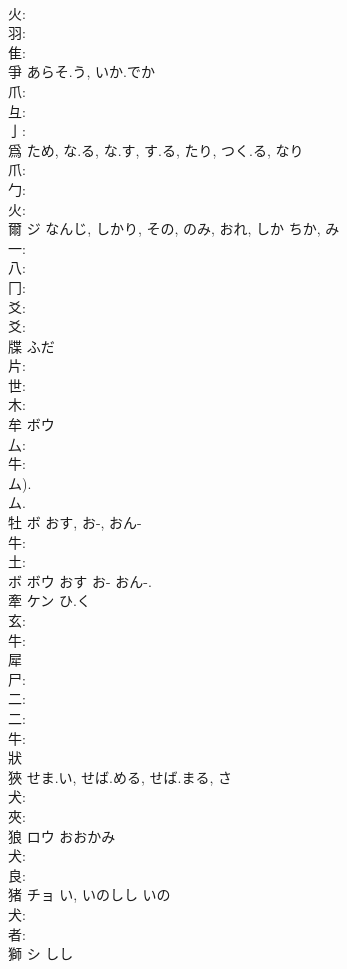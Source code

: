 \documentclass[8pt]{extreport}
\begin{document}
\begin{CJK}{UTF8}{min}
\\	火: 
\\	羽: 
\\	隹: 
\\	爭		あらそ.う, いか.でか				
\\	爪: 
\\	彑: 
\\	亅: 
\\	爲		ため, な.る, な.す, す.る, たり, つく.る, なり				
\\	爪: 
\\	勹: 
\\	火: 
\\	爾	ジ	なんじ, しかり, その, のみ, おれ, しか	ちか, み	
\\	一: 
\\	八: 
\\	冂: 
\\	爻: 
\\	爻: 
\\	牒		ふだ				
\\	片: 
\\	世: 
\\	木: 
\\	牟	ボウ			
\\	厶: 
\\	牛: 
\\	ム).
\\	ム.
\\	牡	ボ	おす, お-, おん-		
\\	牛: 
\\	土: 
\\	ボ ボウ おす お- おん-.
\\	牽	ケン	ひ.く		
\\	玄: 
\\	牛: 
\\	犀						
\\	尸: 
\\	二: 
\\	二: 
\\	牛: 
\\	狀						
\\	狹		せま.い, せば.める, せば.まる, さ				
\\	犬: 
\\	夾: 
\\	狼	ロウ	おおかみ		
\\	犬: 
\\	良: 
\\	猪	チョ	い, いのしし	いの	
\\	犬: 
\\	者: 
\\	獅	シ	しし		

\end{CJK}
\end{document}
